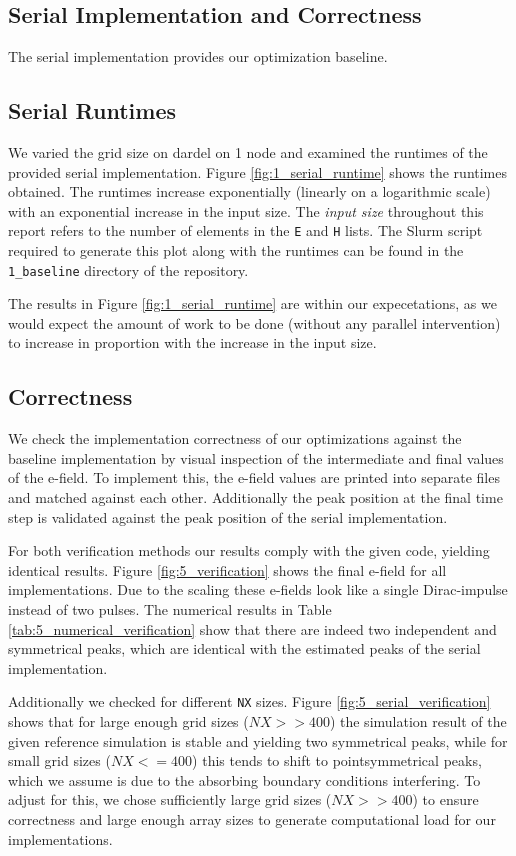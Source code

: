 \documentclass[a4paper,10pt]{article}
\begin{document}
\begin{multicols}{2}
\section{Serial Implementation and Correctness}
The serial implementation provides our optimization baseline. 

\subsection{Serial Runtimes}
We varied the grid size on dardel on 1 node and examined the runtimes of the provided serial implementation. Figure \ref{fig:1_serial_runtime} shows the runtimes obtained. The runtimes increase exponentially (linearly on a logarithmic scale) with an exponential increase in the input size. The \textit{input size} throughout this report refers to the number of elements in the \verb|E| and \verb|H| lists. The Slurm script required to generate this plot along with the runtimes can be found in the \verb|1_baseline| directory of the repository.


The results in Figure \ref{fig:1_serial_runtime} are within our expecetations, as we would expect the amount of work to be done (without any parallel intervention) to increase in proportion with the increase in the input size.  

\subsection{Correctness}
We check the implementation correctness of our optimizations against the baseline implementation by visual inspection of the intermediate and final values of the e-field.
To implement this, the e-field values are printed into separate files and matched against each other.
Additionally the peak position at the final time step is validated against the peak position of the serial implementation. 

For both verification methods our results comply with the given code, yielding identical results. Figure \ref{fig:5_verification} shows the final e-field for all implementations. 
Due to the scaling these e-fields look like a single Dirac-impulse instead of two pulses. 
The numerical results in Table \ref{tab:5_numerical_verification} show that there are indeed two independent and symmetrical peaks, which are identical with the estimated peaks of the serial implementation.

Additionally we checked for different \verb|NX| sizes. Figure \ref{fig:5_serial_verification} shows that for large enough grid sizes ($NX >> 400$) the simulation result of the given reference simulation is stable and yielding two symmetrical peaks, while for small grid sizes ($NX <= 400$) this tends to shift to pointsymmetrical peaks, which we assume is due to the absorbing boundary conditions interfering.
To adjust for this, we chose sufficiently large grid sizes ($NX >> 400$) to ensure correctness and large enough array sizes to generate computational load for our implementations.


\end{multicols}
\end{document}
